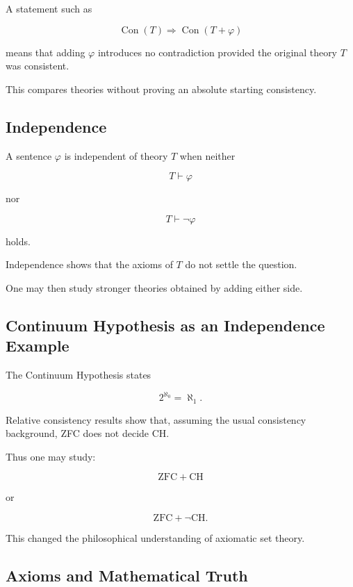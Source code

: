 A statement such as

\[
\boxed{
\operatorname{Con}(T)
\Longrightarrow
\operatorname{Con}(T+\varphi)
}
\]

means that adding \(\varphi\) introduces no contradiction provided the
original theory \(T\) was consistent.

This compares theories without proving an absolute starting consistency.

\subsection{Independence}
\label{subsec:foundational-independence}

A sentence \(\varphi\) is independent of theory \(T\) when neither

\[
\boxed{
T\vdash\varphi
}
\]

nor

\[
\boxed{
T\vdash\neg\varphi
}
\]

holds.

Independence shows that the axioms of \(T\) do not settle the question.

One may then study stronger theories obtained by adding either side.

\subsection{Continuum Hypothesis as an Independence Example}
\label{subsec:ch-foundational-example}

The Continuum Hypothesis states

\[
\boxed{
2^{\aleph_0}
=
\aleph_1.
}
\]

Relative consistency results show that, assuming the usual consistency
background, ZFC does not decide CH.

Thus one may study:

\[
\boxed{
\mathrm{ZFC}+\mathrm{CH}
}
\]

or

\[
\boxed{
\mathrm{ZFC}+\neg\mathrm{CH}.
}
\]

This changed the philosophical understanding of axiomatic set theory.

\subsection{Axioms and Mathematical Truth}
\label{subsec:axioms-and-truth}

